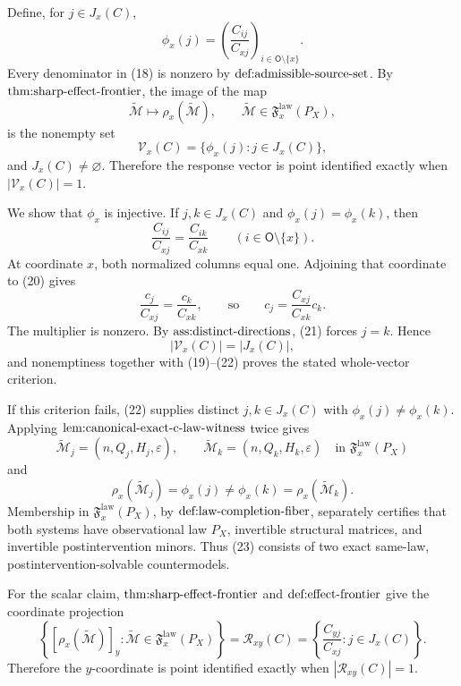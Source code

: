 Define, for \(j\in J_x(C)\),
\[
 \phi_x(j)=
 \left(\frac{C_{ij}}{C_{xj}}\right)_{i\in\mathsf O\setminus\{x\}}.
                                                                            \tag{18}
\]
Every denominator in (18) is nonzero by \(\textnormal{def:admissible-source-set}\).  By \(\textnormal{thm:sharp-effect-frontier}\), the image of the map
\[
 \widetilde{\mathcal M}\longmapsto\rho_x(\widetilde{\mathcal M}),
 \qquad
 \widetilde{\mathcal M}\in\mathfrak F_x^{\mathrm{law}}(P_X),
\]
is the nonempty set
\[
 \mathcal V_x(C)=\{\phi_x(j):j\in J_x(C)\},                                 \tag{19}
\]
and \(J_x(C)\ne\varnothing\).  Therefore the response vector is point identified exactly when \(|\mathcal V_x(C)|=1\).

We show that \(\phi_x\) is injective.  If \(j,k\in J_x(C)\) and
\(\phi_x(j)=\phi_x(k)\), then
\[
 \frac{C_{ij}}{C_{xj}}=\frac{C_{ik}}{C_{xk}}
 \qquad(i\in\mathsf O\setminus\{x\}).                                      \tag{20}
\]
At coordinate \(x\), both normalized columns equal one.  Adjoining that coordinate to (20) gives
\[
 \frac{c_j}{C_{xj}}=\frac{c_k}{C_{xk}},
 \qquad\text{so}\qquad
 c_j=\frac{C_{xj}}{C_{xk}}c_k.                                             \tag{21}
\]
The multiplier is nonzero.  By \(\textnormal{ass:distinct-directions}\), (21) forces \(j=k\).  Hence
\[
 |\mathcal V_x(C)|=|J_x(C)|,                                                \tag{22}
\]
and nonemptiness together with (19)--(22) proves the stated whole-vector criterion.

If this criterion fails, (22) supplies distinct \(j,k\in J_x(C)\) with
\(\phi_x(j)\ne\phi_x(k)\).  Applying
\(\textnormal{lem:canonical-exact-c-law-witness}\) twice gives
\[
 \widetilde{\mathcal M}_j=(n,Q_j,H_j,\varepsilon),\qquad
 \widetilde{\mathcal M}_k=(n,Q_k,H_k,\varepsilon)
 \quad\text{in }\mathfrak F_x^{\mathrm{law}}(P_X)
\]
and
\[
 \rho_x(\widetilde{\mathcal M}_j)=\phi_x(j)
 \ne\phi_x(k)=\rho_x(\widetilde{\mathcal M}_k).                             \tag{23}
\]
Membership in \(\mathfrak F_x^{\mathrm{law}}(P_X)\), by
\(\textnormal{def:law-completion-fiber}\), separately certifies that both systems have observational law \(P_X\), invertible structural matrices, and invertible postintervention minors.  Thus (23) consists of two exact same-law, postintervention-solvable countermodels.

For the scalar claim, \(\textnormal{thm:sharp-effect-frontier}\) and
\(\textnormal{def:effect-frontier}\) give the coordinate projection
\[
 \left\{[\rho_x(\widetilde{\mathcal M})]_y:
 \widetilde{\mathcal M}\in\mathfrak F_x^{\mathrm{law}}(P_X)\right\}
 =\mathcal R_{xy}(C)
 =\left\{\frac{C_{yj}}{C_{xj}}:j\in J_x(C)\right\}.                         \tag{24}
\]
Therefore the \(y\)-coordinate is point identified exactly when
\(|\mathcal R_{xy}(C)|=1\).

